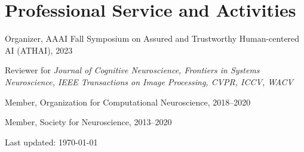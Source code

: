 \documentclass[10pt,letterpaper]{article}
\def\footerlink{} %
\renewenvironment{itemize}{
  \begin{list}{}{
    \setlength{\leftmargin}{1.5em}
    \setlength{\itemsep}{0.25em}
    \setlength{\parskip}{0pt}
    \setlength{\parsep}{0.25em}
  }
}{
  \end{list}
}
\begin{document}
\section*{Professional Service and Activities}
\vspace{-0.05in}
\begin{itemize}
  \setlength\itemsep{1pt}
  \item Organizer, AAAI Fall Symposium on Assured and Trustworthy Human-centered AI (ATHAI), 2023
  \item Reviewer for \textit{Journal of Cognitive Neuroscience, Frontiers in Systems Neuroscience, IEEE Transactions on Image Processing, CVPR, ICCV, WACV}
  \item Member, Organization for Computational Neuroscience, 2018--2020
  \item Member, Society for Neuroscience, 2013--2020
\end{itemize}

\bigskip

\begin{center}
  \begin{footnotesize}
    Last updated: \today \\
    \href{\footerlink}{\texttt{\footerlink}}
  \end{footnotesize}
\end{center}
\end{document}
